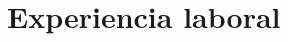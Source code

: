 \documentclass[11pt, letterpaper, sans]{moderncv}        %
\begin{document}










\section{Experiencia laboral}

\vspace{6pt}
\end{document}
